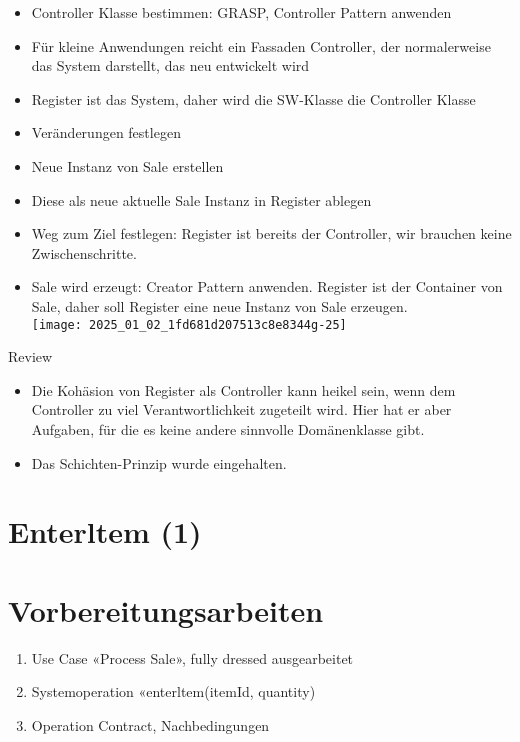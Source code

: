 \documentclass[10pt]{article}
\begin{document}
\begin{itemize}
  \item Controller Klasse bestimmen: GRASP, Controller Pattern anwenden
  \item Für kleine Anwendungen reicht ein Fassaden Controller, der normalerweise das System darstellt, das neu entwickelt wird
  \item Register ist das System, daher wird die SW-Klasse die Controller Klasse
  \item Veränderungen festlegen
  \item Neue Instanz von Sale erstellen
  \item Diese als neue aktuelle Sale Instanz in Register ablegen
  \item Weg zum Ziel festlegen: Register ist bereits der Controller, wir brauchen keine Zwischenschritte.
  \item Sale wird erzeugt: Creator Pattern anwenden. Register ist der Container von Sale, daher soll Register eine neue Instanz von Sale erzeugen.\\
\texttt{[image: 2025\_01\_02\_1fd681d207513c8e8344g-25]}
\end{itemize}

Review

\begin{itemize}
  \item Die Kohäsion von Register als Controller kann heikel sein, wenn dem Controller zu viel Verantwortlichkeit zugeteilt wird. Hier hat er aber Aufgaben, für die es keine andere sinnvolle Domänenklasse gibt.
  \item Das Schichten-Prinzip wurde eingehalten.
\end{itemize}

\section*{Enterltem (1)}
\section*{Vorbereitungsarbeiten}
\begin{enumerate}
  \item Use Case «Process Sale», fully dressed ausgearbeitet
  \item Systemoperation «enterltem(itemId, quantity)
  \item Operation Contract, Nachbedingungen
\end{enumerate}
\end{document}
